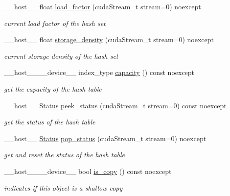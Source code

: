 \begin{DoxyCompactItemize}
\+\_\+\+\_\+host\+\_\+\+\_\+ float \hyperlink{classwarpcore_1_1HashSet_a986019ba68d32cd8270d34e106f12c9a}{load\+\_\+factor} (cuda\+Stream\+\_\+t stream=0) noexcept
\begin{DoxyCompactList}\small\item\em current load factor of the hash set \end{DoxyCompactList}\item 
\+\_\+\+\_\+host\+\_\+\+\_\+ float \hyperlink{classwarpcore_1_1HashSet_a11adf7a98c8686f220f2f556a810a211}{storage\+\_\+density} (cuda\+Stream\+\_\+t stream=0) noexcept
\begin{DoxyCompactList}\small\item\em current storage density of the hash set \end{DoxyCompactList}\item 
\+\_\+\+\_\+host\+\_\+\+\_\+\+\_\+\+\_\+device\+\_\+\+\_\+ index\+\_\+type \hyperlink{classwarpcore_1_1HashSet_a6edef2d260c214f294b61bb394a11545}{capacity} () const noexcept
\begin{DoxyCompactList}\small\item\em get the capacity of the hash table \end{DoxyCompactList}\item 
\+\_\+\+\_\+host\+\_\+\+\_\+ \hyperlink{classwarpcore_1_1Status}{Status} \hyperlink{classwarpcore_1_1HashSet_a15b81a16c6fbdb88dee1fd8c05a9fdbd}{peek\+\_\+status} (cuda\+Stream\+\_\+t stream=0) const noexcept
\begin{DoxyCompactList}\small\item\em get the status of the hash table \end{DoxyCompactList}\item 
\+\_\+\+\_\+host\+\_\+\+\_\+ \hyperlink{classwarpcore_1_1Status}{Status} \hyperlink{classwarpcore_1_1HashSet_ae9a6c692c64bbc40bb6abd3372b946d1}{pop\+\_\+status} (cuda\+Stream\+\_\+t stream=0) noexcept
\begin{DoxyCompactList}\small\item\em get and reset the status of the hash table \end{DoxyCompactList}\item 
\+\_\+\+\_\+host\+\_\+\+\_\+\+\_\+\+\_\+device\+\_\+\+\_\+ bool \hyperlink{classwarpcore_1_1HashSet_ac1b20d9d5305bbd8e7fca93aa580c984}{is\+\_\+copy} () const noexcept
\begin{DoxyCompactList}\small\item\em indicates if this object is a shallow copy \end{DoxyCompactList}\end{DoxyCompactItemize}
